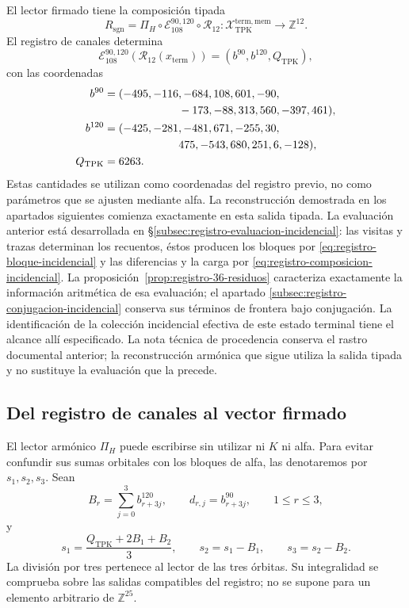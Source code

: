 El lector firmado tiene la composición tipada
\begin{equation}
 R_{\mathrm{sgn}}
 =\Pi_H\circ\mathcal E_{108}^{90,120}\circ\mathcal R_{12}:
 \mathcal X_{\mathrm{TPK}}^{\mathrm{term,mem}}
 \longrightarrow\mathbb Z^{12}.
 \label{eq:k-lector-firmado}
\end{equation}
El registro de canales determina
\[
 \mathcal E_{108}^{90,120}(\mathcal R_{12}(x_{\mathrm{term}}))
 =(b^{90},b^{120},Q_{\mathrm{TPK}}),
\]
con las coordenadas
\begin{align*}
 b^{90}={}&(-495,-116,-684,108,601,-90,\\
            &\hspace{19mm}-173,-88,313,560,-397,461),\\
 b^{120}={}&(-425,-281,-481,671,-255,30,\\
             &\hspace{19mm}475,-543,680,251,6,-128),\\
 Q_{\mathrm{TPK}}={}&6263.
\end{align*}
Estas cantidades se utilizan como coordenadas del registro previo, no
como parámetros que se ajusten mediante alfa. La reconstrucción demostrada
en los apartados siguientes comienza exactamente en esta salida tipada.
La evaluación anterior está desarrollada en
\S\ref{subsec:registro-evaluacion-incidencial}: las visitas y trazas
determinan los recuentos, éstos producen los bloques por
\eqref{eq:registro-bloque-incidencial} y las diferencias y la carga por
\eqref{eq:registro-composicion-incidencial}. La
proposición~\ref{prop:registro-36-residuos} caracteriza exactamente la
información aritmética de esa evaluación; el apartado
\ref{subsec:registro-conjugacion-incidencial} conserva sus términos de
frontera bajo conjugación. La identificación de la colección incidencial
efectiva de este estado terminal tiene el alcance allí especificado.
La nota técnica de procedencia conserva el rastro documental anterior;
la reconstrucción armónica que sigue utiliza la salida tipada y no
sustituye la evaluación que la precede.

\subsection{Del registro de canales al vector firmado}
\label{subsec:k-pi-h}

El lector armónico \(\Pi_H\) puede escribirse sin utilizar ni \(K\) ni
alfa. Para evitar confundir sus sumas orbitales con los bloques de alfa,
las denotaremos por \(s_1,s_2,s_3\). Sean
\[
 B_r=\sum_{j=0}^{3}b^{120}_{r+3j},\qquad
 d_{r,j}=b^{90}_{r+3j},\qquad1\leq r\leq3,
\]
y
\begin{equation}
 s_1=\frac{Q_{\mathrm{TPK}}+2B_1+B_2}{3},\qquad
 s_2=s_1-B_1,\qquad s_3=s_2-B_2.
 \label{eq:k-sumas-armonicas}
\end{equation}
La división por tres pertenece al lector de las tres órbitas. Su
integralidad se comprueba sobre las salidas compatibles del registro; no
se supone para un elemento arbitrario de \(\mathbb Z^{25}\).

